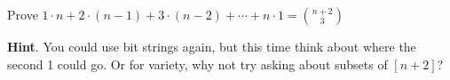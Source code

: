 \documentclass{book}
\begin{document}
\setcounter{cpjt}{103}
\addtocounter{cpjt}{-1}
\begin{activity}\label{activity-96}
\hypertarget{p-717}{}%
Prove \(1\cdot n + 2 \cdot (n-1) + 3 \cdot (n-2) + \cdots + n \cdot 1 = \binom{n+2}{3}\)%
\par\smallskip%
\noindent\textbf{Hint}.\hypertarget{hint-57}{}\quad%
\hypertarget{p-718}{}%
You could use bit strings again, but this time think about where the second 1 could go.  Or for variety, why not try asking about subsets of \([n+2]\)?%
\par\smallskip%
\noindent\end{activity}

\clearpage
\end{document}
